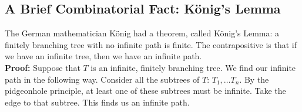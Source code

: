 \subsection{A Brief Combinatorial Fact: K\"onig's Lemma}
The German mathematician K\"onig had a theorem, called K\"onig's Lemma: a finitely branching tree with no infinite path is finite. The contrapositive is that if we have an infinite tree, then we have an infinite path.\\

\textbf{Proof:} Suppose that $T$ is an infinite, finitely branching tree. We find our infinite path in the following way. Consider all the subtrees of $T$: $T_1,\ldots T_n$. By the pidgeonhole principle, at least one of these subtrees must be infinite. Take the edge to that subtree. This finds us an infinite path. \qqed